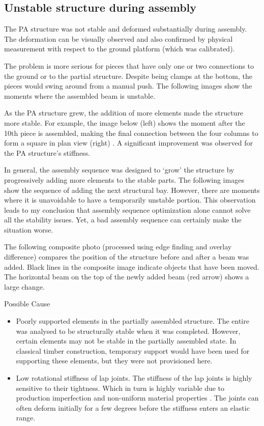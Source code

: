 \subsection{Unstable structure during assembly}
\label{subsection:exploration-2-unstable-structure-during-assembly}

The PA structure was not stable and deformed substantially during assembly. The deformation can be visually observed and also confirmed by physical measurement with respect to the ground platform (which was calibrated).

The problem is more serious for pieces that have only one or two connections to the ground or to the partial structure. Despite being clamps at the bottom, the pieces would swing around from a manual push. The following images show the moments where the assembled beam is unstable.

As the PA structure grew, the addition of more elements made the structure more stable. For example, the image below (left) shows the moment after the 10th piece is assembled, making the final connection between the four columns to form a square in plan view (right) . A significant improvement was observed for the PA structure’s stiffness. 

In general, the assembly sequence was designed to ‘grow’ the structure by progressively adding more elements to the stable parts. The following images show the sequence of adding the next structural bay. However, there are moments where it is unavoidable to have a temporarily unstable portion. This observation leads to my conclusion that assembly sequence optimization alone cannot solve all the stability issues. Yet, a bad assembly sequence can certainly make the situation worse.

The following composite photo (processed using edge finding and overlay difference) compares the position of the structure before and after a beam was added. Black lines in the composite image indicate objects that have been moved. The horizontal beam on the top of the newly added beam (red arrow) shows a large change.

Possible Cause
\begin{itemize}
    \item Poorly supported elements in the partially assembled structure. The entire was analysed to be structurally stable when it was completed. However, certain elements may not be stable in the partially assembled state. In classical timber construction, temporary support would have been used for supporting these elements, but they were not provisioned here.
    \item Low rotational stiffness of lap joints. The stiffness of the lap joints is highly sensitive to their tightness. Which in turn is highly variable due to production imperfection and non-uniform material properties \parencite{qinRotationalBehaviorColumn2018}. The joints can often deform initially for a few degrees before the stiffness enters an elastic range.
\end{itemize}

